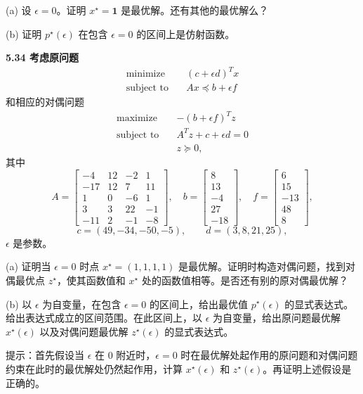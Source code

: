 \documentclass[UTF8, 12pt, fontset=fandol, oneside]{ctexart}
\begin{document}
(a) 设 $\epsilon=0$。证明 $x^\star=\mathbf{1}$ 是最优解。还有其他的最优解么？

(b) 证明 $p^\star(\epsilon)$ 在包含 $\epsilon=0$ 的区间上是仿射函数。

\noindent\textbf{5.34 考虑原问题}
\[
\begin{aligned}
\text{minimize}\quad & (c+\epsilon d)^Tx\\
\text{subject to}\quad & Ax\preceq b+\epsilon f
\end{aligned}
\]
和相应的对偶问题
\[
\begin{aligned}
\text{maximize}\quad & -(b+\epsilon f)^Tz\\
\text{subject to}\quad & A^Tz+c+\epsilon d=0\\
& z\succeq 0,
\end{aligned}
\]
其中
\[
A=
\begin{bmatrix}
-4 & 12 & -2 & 1\\
-17 & 12 & 7 & 11\\
1 & 0 & -6 & 1\\
3 & 3 & 22 & -1\\
-11 & 2 & -1 & -8
\end{bmatrix},\quad
b=
\begin{bmatrix}
8\\
13\\
-4\\
27\\
-18
\end{bmatrix},\quad
f=
\begin{bmatrix}
6\\
15\\
-13\\
48\\
8
\end{bmatrix},
\]
\[
c=(49,-34,-50,-5),\qquad d=(3,8,21,25),
\]
$\epsilon$ 是参数。

(a) 证明当 $\epsilon=0$ 时点 $x^\star=(1,1,1,1)$ 是最优解。证明时构造对偶问题，找到对偶最优点 $z^\star$，使其函数值和 $x^\star$ 处的函数值相等。是否还有别的原对偶最优解？

(b) 以 $\epsilon$ 为自变量，在包含 $\epsilon=0$ 的区间上，给出最优值 $p^\star(\epsilon)$ 的显式表达式。给出表达式成立的区间范围。在此区间上，以 $\epsilon$ 为自变量，给出原问题最优解 $x^\star(\epsilon)$ 以及对偶问题最优解 $z^\star(\epsilon)$ 的显式表达式。

提示：首先假设当 $\epsilon$ 在 0 附近时，$\epsilon=0$ 时在最优解处起作用的原问题和对偶问题约束在此时的最优解处仍然起作用，计算 $x^\star(\epsilon)$ 和 $z^\star(\epsilon)$。再证明上述假设是正确的。
\end{document}
